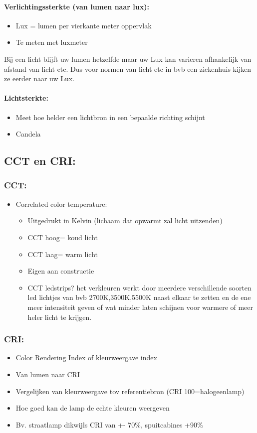 \documentclass[12pt]{article}
\begin{document}
\paragraph{Verlichtingssterkte (van lumen naar lux):}\begin{itemize}
    \item Lux = lumen per vierkante meter oppervlak
    \item Te meten met luxmeter
\end{itemize}
Bij een licht blijft uw lumen hetzelfde maar uw Lux kan varieren afhankelijk van afstand van licht etc. Dus voor normen van licht etc in bvb een ziekenhuis kijken ze eerder naar uw Lux.
\paragraph{Lichtsterkte:}
\begin{itemize}
    \item Meet hoe helder een lichtbron in een bepaalde richting schijnt
    \item Candela
\end{itemize}
\subsection{CCT en CRI:}
\subsubsection{CCT:}\begin{itemize}
    \item Correlated color temperature:\begin{itemize}
        \item Uitgedrukt in Kelvin (lichaam dat opwarmt zal licht uitzenden)
        \item CCT hoog= koud licht
        \item CCT laag= warm licht
        \item Eigen aan constructie
        \item CCT ledstrips? het verkleuren werkt door meerdere verschillende soorten led lichtjes van bvb 2700K,3500K,5500K naast elkaar te zetten en de ene meer intensiteit geven of wat minder laten schijnen voor warmere of meer heler licht te krijgen.
    \end{itemize}
\end{itemize}
\subsubsection{CRI:}\begin{itemize}
    \item Color Rendering Index of kleurweergave index
    \item Van lumen naar CRI
    \item Vergelijken van kleurweergave tov referentiebron (CRI 100=halogeenlamp)
    \item Hoe goed kan de lamp de echte kleuren weergeven 
    \item Bv. straatlamp dikwijls CRI van +- 70\%, spuitcabines +90\%
\end{itemize}
\end{document}
